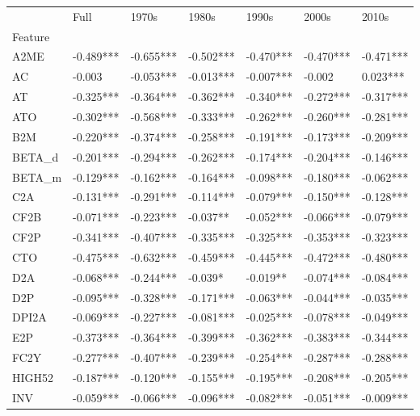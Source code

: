 \begin{tabular}{lllllll}
\toprule
{} &       Full &      1970s &      1980s &      1990s &      2000s &      2010s \\
Feature &            &            &            &            &            &            \\
\midrule
A2ME    &  -0.489*** &  -0.655*** &  -0.502*** &  -0.470*** &  -0.470*** &  -0.471*** \\
AC      &     -0.003 &  -0.053*** &  -0.013*** &  -0.007*** &     -0.002 &   0.023*** \\
AT      &  -0.325*** &  -0.364*** &  -0.362*** &  -0.340*** &  -0.272*** &  -0.317*** \\
ATO     &  -0.302*** &  -0.568*** &  -0.333*** &  -0.262*** &  -0.260*** &  -0.281*** \\
B2M     &  -0.220*** &  -0.374*** &  -0.258*** &  -0.191*** &  -0.173*** &  -0.209*** \\
BETA\_d  &  -0.201*** &  -0.294*** &  -0.262*** &  -0.174*** &  -0.204*** &  -0.146*** \\
BETA\_m  &  -0.129*** &  -0.162*** &  -0.164*** &  -0.098*** &  -0.180*** &  -0.062*** \\
C2A     &  -0.131*** &  -0.291*** &  -0.114*** &  -0.079*** &  -0.150*** &  -0.128*** \\
CF2B    &  -0.071*** &  -0.223*** &   -0.037** &  -0.052*** &  -0.066*** &  -0.079*** \\
CF2P    &  -0.341*** &  -0.407*** &  -0.335*** &  -0.325*** &  -0.353*** &  -0.323*** \\
CTO     &  -0.475*** &  -0.632*** &  -0.459*** &  -0.445*** &  -0.472*** &  -0.480*** \\
D2A     &  -0.068*** &  -0.244*** &    -0.039* &   -0.019** &  -0.074*** &  -0.084*** \\
D2P     &  -0.095*** &  -0.328*** &  -0.171*** &  -0.063*** &  -0.044*** &  -0.035*** \\
DPI2A   &  -0.069*** &  -0.227*** &  -0.081*** &  -0.025*** &  -0.078*** &  -0.049*** \\
E2P     &  -0.373*** &  -0.364*** &  -0.399*** &  -0.362*** &  -0.383*** &  -0.344*** \\
FC2Y    &  -0.277*** &  -0.407*** &  -0.239*** &  -0.254*** &  -0.287*** &  -0.288*** \\
HIGH52  &  -0.187*** &  -0.120*** &  -0.155*** &  -0.195*** &  -0.208*** &  -0.205*** \\
INV     &  -0.059*** &  -0.066*** &  -0.096*** &  -0.082*** &  -0.051*** &  -0.009*** \\

\end{tabular}
